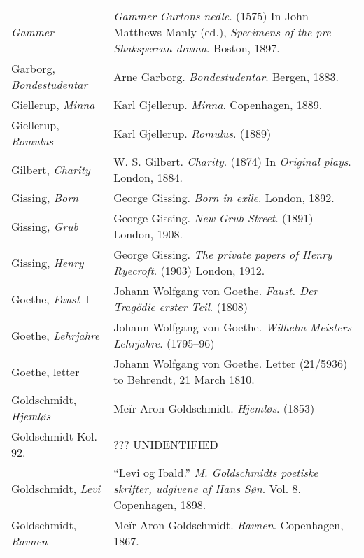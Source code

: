 \begin{longtable}{p{} p{}}
\textit{Gammer} & \textit{Gammer Gurtons nedle}. (1575) In John Matthews Manly (ed.), \textit{Specimens of the pre-Shaksperean drama}. Boston, 1897. \\ %

\raggedright{Garborg, \textit{Bondestudentar}} & Arne Garborg. \textit{Bondestudentar}. Bergen, 1883. \\

Giellerup, \textit{Minna} & Karl Gjellerup. \textit{Minna}. Copenhagen, 1889. \\ %
Giellerup, \textit{Romulus} & Karl Gjellerup. \textit{Romulus}. (1889) \\

Gilbert, \textit{Charity} & W. S. Gilbert. \textit{Charity}. (1874) In \textit{Original plays}. London, 1884. \\

Gissing, \textit{Born} & George Gissing. \textit{Born in exile}. London, 1892. \\
Gissing, \textit{Grub} & George Gissing. \textit{New Grub Street}. (1891) London, 1908. \\
Gissing, \textit{Henry} & George Gissing. \textit{The private papers of Henry Ryecroft}. (1903) London, 1912. \\

\raggedright {Goethe, \textit{Faust}~I} & Johann Wolfgang von Goethe. \textit{Faust. Der Tragödie erster Teil}. (1808) \\
Goethe, \textit{Lehrjahre} & Johann Wolfgang von Goethe. \textit{Wilhelm Meisters Lehrjahre}. (1795–96) \\
Goethe, letter & Johann Wolfgang von Goethe. Letter (21/5936) to Behrendt, 21 March 1810. \\ %

Goldschmidt, \textit{Hjemløs} & Meïr Aron Goldschmidt. \textit{Hjemløs}. (1853) \\
Goldschmidt Kol. 92. & ??? UNIDENTIFIED \\ %
Goldschmidt, \textit{Levi} & ``Levi og Ibald.'' \textit{M. Goldschmidts poetiske skrifter, udgivene af Hans Søn}. Vol. 8. Copenhagen, 1898. \\ 
Goldschmidt, \textit{Ravnen} & Meïr Aron Goldschmidt. \textit{Ravnen}. Copenhagen, 1867. \\ %


\end{longtable}

